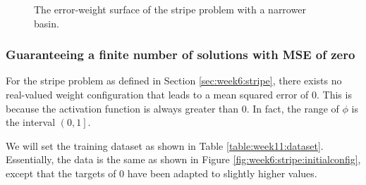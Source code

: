 \documentclass{article}
\begin{document}
\begin{figure}[h]
    \centering
    \caption{The error-weight surface of the stripe problem with a narrower basin.}
    \label{fig:week11:stripe:errorsurface:thin}
\end{figure}

\subsubsection{Guaranteeing a finite number of solutions with MSE of zero}

For the stripe problem as defined in Section \ref{sec:week6:stripe}, there exists no real-valued weight configuration that leads to a mean squared error of 0. 
This is because the activation function is always greater than 0. In fact, the range of $\phi$ is the interval $\left(0, 1\right]$.

We will set the training dataset as shown in Table \ref{table:week11:dataset}. 
Essentially, the data is the same as shown in Figure \ref{fig:week6:stripe:initialconfig}, except that the targets of $0$ have been adapted to slightly higher values.
\end{document}
